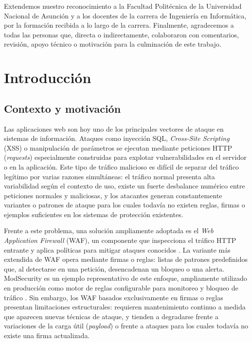 \documentclass[12pt,oneside]{report}
\begin{document}
Extendemos nuestro reconocimiento a la Facultad Politécnica de la Universidad Nacional de Asunción y a los docentes de la carrera de Ingeniería en Informática, por la formación recibida a lo largo de la carrera. Finalmente, agradecemos a todas las personas que, directa o indirectamente, colaboraron con comentarios, revisión, apoyo técnico o motivación para la culminación de este trabajo.

\tableofcontents
\listoffigures
\clearpage
{}

\chapter{Introducción}

\section{Contexto y motivación}
Las aplicaciones web son hoy uno de los principales vectores de ataque en sistemas de información. Ataques como inyección SQL, \textit{Cross-Site Scripting} (XSS) o manipulación de parámetros se ejecutan mediante peticiones HTTP (\textit{requests}) especialmente construidas para explotar vulnerabilidades en el servidor o en la aplicación. Este tipo de tráfico malicioso es difícil de separar del tráfico legítimo por varias razones simultáneas: el tráfico normal presenta alta variabilidad según el contexto de uso, existe un fuerte desbalance numérico entre peticiones normales y maliciosas, y los atacantes generan constantemente variantes o patrones de ataque para los cuales todavía no existen reglas, firmas o ejemplos suficientes en los sistemas de protección existentes.

Frente a este problema, una solución ampliamente adoptada es el \textit{Web Application Firewall} (WAF), un componente que inspecciona el tráfico HTTP entrante y aplica políticas para mitigar ataques conocidos \cite{owasp_waf}. La variante más extendida de WAF opera mediante firmas o reglas: listas de patrones predefinidos que, al detectarse en una petición, desencadenan un bloqueo o una alerta. ModSecurity es un ejemplo representativo de este enfoque, ampliamente utilizado en producción como motor de reglas configurable para monitoreo y bloqueo de tráfico \cite{modsecurity_site}. Sin embargo, los WAF basados exclusivamente en firmas o reglas presentan limitaciones estructurales: requieren mantenimiento continuo a medida que aparecen nuevas técnicas de ataque, y tienden a degradarse frente a variaciones de la carga útil (\textit{payload}) o frente a ataques para los cuales todavía no existe una firma actualizada.
\end{document}
